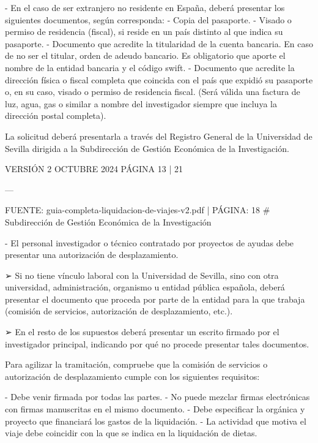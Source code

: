 \documentclass{article}
\begin{document}
\begin{itemize}
\begin{itemize}
\begin{scriptsize}
                  - En el caso de ser extranjero no residente en España, deberá presentar los siguientes documentos, según corresponda:
                  - Copia del pasaporte.
                  - Visado o permiso de residencia (fiscal), si reside en un país distinto al que indica su pasaporte.
                  - Documento que acredite la titularidad de la cuenta bancaria. En caso de no ser el titular, orden de adeudo bancario. Es obligatorio que aporte el nombre de la entidad bancaria y el código swift.
                  - Documento que acredite la dirección física o fiscal completa que coincida con el país que expidió su pasaporte o, en su caso, visado o permiso de residencia fiscal. (Será válida una factura de luz, agua, gas o similar a nombre del investigador siempre que incluya la dirección postal completa).

                  La solicitud deberá presentarla a través del Registro General de la Universidad de Sevilla dirigida a la Subdirección de Gestión Económica de la Investigación.

                  VERSIÓN 2 OCTUBRE 2024    PÁGINA 13 | 21

                  ---

                  FUENTE: guia-completa-liquidacion-de-viajes-v2.pdf | PÁGINA: 18
                  \# Subdirección de Gestión Económica de la Investigación

                  - El personal investigador o técnico contratado por proyectos de ayudas debe presentar una autorización de desplazamiento.

                  ➢ Si no tiene vínculo laboral con la Universidad de Sevilla, sino con otra universidad, administración, organismo u entidad pública española, deberá presentar el documento que proceda por parte de la entidad para la que trabaja (comisión de servicios, autorización de desplazamiento, etc.).

                  ➢ En el resto de los supuestos deberá presentar un escrito firmado por el investigador principal, indicando por qué no procede presentar tales documentos.

                  Para agilizar la tramitación, compruebe que la comisión de servicios o autorización de desplazamiento cumple con los siguientes requisitos:

                  - Debe venir firmada por todas las partes.
                  - No puede mezclar firmas electrónicas con firmas manuscritas en el mismo documento.
                  - Debe especificar la orgánica y proyecto que financiará los gastos de la liquidación.
                  - La actividad que motiva el viaje debe coincidir con la que se indica en la liquidación de dietas.


\end{scriptsize}
\end{itemize}
\end{itemize}
\end{document}
